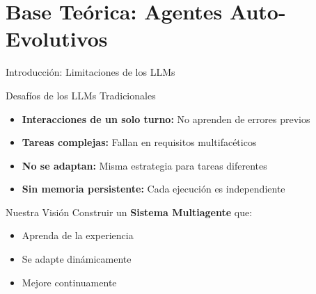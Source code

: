 \documentclass[aspectratio=169,11pt]{beamer}
\begin{document}
\section{Base Teórica: Agentes Auto-Evolutivos}

\begin{frame}{Introducción: Limitaciones de los LLMs}
\begin{block}{Desafíos de los LLMs Tradicionales}
\begin{itemize}
    \item \textbf{Interacciones de un solo turno:} No aprenden de errores previos
    \item \textbf{Tareas complejas:} Fallan en requisitos multifacéticos
    \item \textbf{No se adaptan:} Misma estrategia para tareas diferentes
    \item \textbf{Sin memoria persistente:} Cada ejecución es independiente
\end{itemize}
\end{block}

\vspace{0.3cm}

\begin{exampleblock}{Nuestra Visión}
\Large
Construir un \textbf{Sistema Multiagente} que:
\begin{itemize}
    \item \textcolor{kavakgreen}{Aprenda de la experiencia}
    \item \textcolor{kavakblue}{Se adapte dinámicamente}
    \item \textcolor{kavakorange}{Mejore continuamente}
\end{itemize}
\end{exampleblock}
\end{frame}
\end{document}
